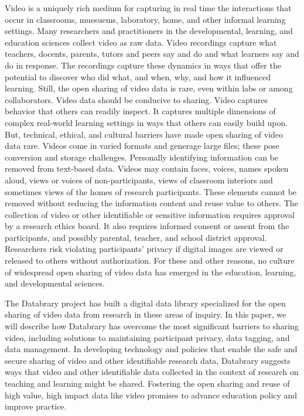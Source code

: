\documentclass[letterpaper,man,natbib]{apa6}
\begin{document}
Video is a uniquely rich medium for capturing in real time the interactions that occur in classrooms, muesuems, laboratory, home, and other informal learning settings.
Many researchers and practitioners in the developmental, learning, and education sciences collect video as raw data.
Video recordings capture what teachers, docents, parents, tutors and peers say and do and what learners say and do in response.
The recordings capture these dynamics in ways that offer the potential to discover who did what, and when, why, and how it influenced learning.
Still, the open sharing of video data is rare, even within labs or among collaborators.
Video data should be conducive to sharing.
Video captures behavior that others can readily inspect.
It captures multiple dimensions of complex real-world learning settings in ways that others can easily build upon. But, technical, ethical, and cultural barriers have made open sharing of video data rare.
Videos come in varied formats and generage large files; these pose conversion and storage challenges.
Personally identifying information can be removed from text-based data.
Videos may contain faces, voices, names spoken aloud, views or voices of non-participants, views of classroom interiors and sometimes views of the homes of research participants. 
These elements cannot be removed without reducing the information content and reuse value to others. 
The collection of video or other identifiable or sensitive information requires approval by a research ethics board.
It also requires informed consent or assent from the participants, and possibly parental, teacher, and school district approval.
Researchers risk violating participants’ privacy if digital images are viewed or released to others without authorization.
For these and other reasons, no culture of widespread open sharing of video data has emerged in the education, learning, and developmental sciences. 

The Databrary project has built a digital data library specialized for the open sharing of video data from research in these areas of inquiry.
In this paper, we will describe how Databrary has overcome the most significant barriers to sharing video, including solutions to maintaining participant privacy, data tagging, and data management.
In developing technology and policies that enable the safe and secure sharing of video and other identifiable research data, Databrary suggests ways that video and other identifiable data collected in the context of research on teaching and learning might be shared.
Fostering the open sharing and reuse of high value, high impact data like video promises to advance education policy and improve practice.
\end{document}
